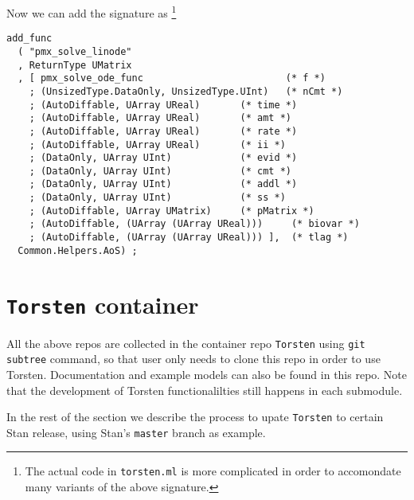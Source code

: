 \documentclass[12pt, reqno, oneside]{amsbook}
\numberwithin{equation}{chapter}
\numberwithin{figure}{chapter}
\numberwithin{table}{chapter}
\theoremstyle{remark}
\begin{document}
Now we can add the signature as \footnote{The actual code in \texttt{torsten.ml} is more complicated in order to
accomondate many variants of the above signature.}
\begin{verbatim}
add_func
  ( "pmx_solve_linode"
  , ReturnType UMatrix
  , [ pmx_solve_ode_func                         (* f *)
    ; (UnsizedType.DataOnly, UnsizedType.UInt)   (* nCmt *)
    ; (AutoDiffable, UArray UReal)       (* time *)
    ; (AutoDiffable, UArray UReal)       (* amt *)
    ; (AutoDiffable, UArray UReal)       (* rate *)
    ; (AutoDiffable, UArray UReal)       (* ii *)
    ; (DataOnly, UArray UInt)            (* evid *)
    ; (DataOnly, UArray UInt)            (* cmt *)
    ; (DataOnly, UArray UInt)            (* addl *)
    ; (DataOnly, UArray UInt)            (* ss *)
    ; (AutoDiffable, UArray UMatrix)     (* pMatrix *)
    ; (AutoDiffable, (UArray (UArray UReal)))     (* biovar *)
    ; (AutoDiffable, (UArray (UArray UReal))) ],  (* tlag *)
  Common.Helpers.AoS) ;
\end{verbatim}

\chapter{\texttt{Torsten} container}
\label{sec:orgd59585c}
All the above repos are collected in the container repo
\texttt{Torsten} using \texttt{git subtree} command, so that user only needs to
clone this repo in order to use Torsten. Documentation and example
models can also be found in this repo. Note that the development of
Torsten functionalilties still happens in each submodule.

In the rest of the section we describe the process to upate \texttt{Torsten}
to certain Stan release, using Stan's \texttt{master} branch as example.
\end{document}
